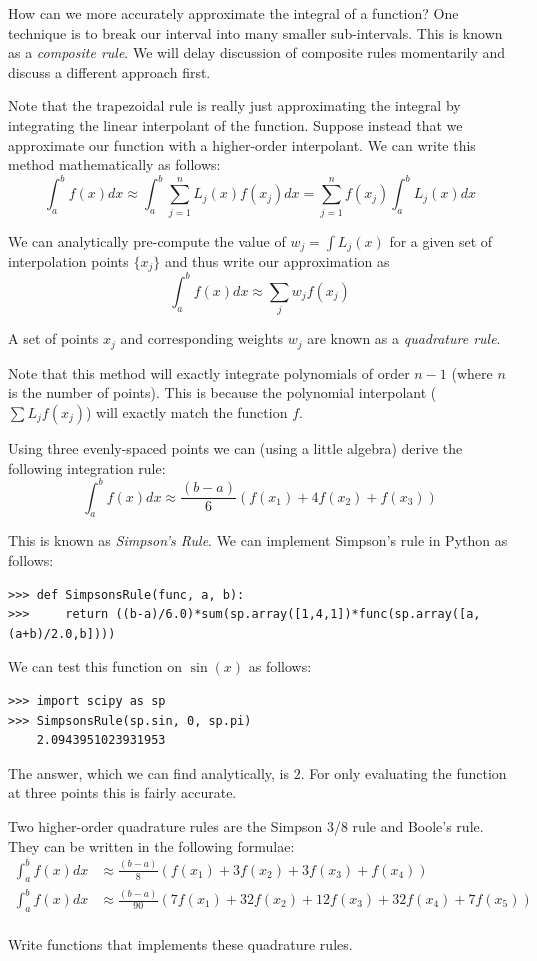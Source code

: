 How can we more accurately approximate the integral of a function?
One technique is to break our interval into many smaller sub-intervals.
This is known as a \emph{composite rule}.
We will delay discussion of composite rules momentarily and discuss a different approach first.

Note that the trapezoidal rule is really just approximating the integral by integrating the linear interpolant of the function.
Suppose instead that we approximate our function with a higher-order interpolant.
We can write this method mathematically as follows:
\[
\int_a^b f(x) dx \approx \int_a^b \sum_{j=1}^n L_j(x)f(x_j) dx = \sum_{j=1}^n f(x_j)\int_a^b L_j(x) dx
\]

We can analytically pre-compute the value of $w_j = \int L_j(x)$ for a given set of interpolation points $\{x_j\}$ and thus write our approximation as
\[
\int_a^b f(x) dx \approx \sum_j w_j f(x_j)
\]

A set of points $x_j$ and corresponding weights $w_j$ are known as a \emph{quadrature rule}.

Note that this method will exactly integrate polynomials of order $n-1$ (where $n$ is the number of points).
This is because the polynomial interpolant ($\sum L_j f(x_j)$) will exactly match the function $f$.

Using three evenly-spaced points we can (using a little algebra) derive the following integration rule:
\[
\int_a^b f(x) dx \approx \frac{(b-a)}{6}\left(f(x_1) + 4 f(x_2) + f(x_3)\right)
\]

This is known as \emph{Simpson's Rule}.
We can implement Simpson's rule in Python as follows:
\begin{lstlisting}
>>> def SimpsonsRule(func, a, b):
>>>     return ((b-a)/6.0)*sum(sp.array([1,4,1])*func(sp.array([a,(a+b)/2.0,b])))
\end{lstlisting}

We can test this function on $\sin(x)$ as follows:
\begin{lstlisting}
>>> import scipy as sp
>>> SimpsonsRule(sp.sin, 0, sp.pi)
	2.0943951023931953
\end{lstlisting}

The answer, which we can find analytically, is $2$.
For only evaluating the function at three points this is fairly accurate.

\begin{problem}
Two higher-order quadrature rules are the Simpson 3/8 rule and Boole's rule.
They can be written in the following formulae:
\begin{align*}
\int_a^b f(x) dx &\approx \frac{(b-a)}{8}\left(f(x_1) + 3 f(x_2) + 3 f(x_3) + f(x_4)\right) \\
\int_a^b f(x) dx &\approx \frac{(b-a)}{90}\left(7f(x_1) + 32 f(x_2) + 12 f(x_3) + 32f(x_4) + 7 f(x_5)\right) \\
\end{align*}

Write functions that implements these quadrature rules.
\end{problem}

